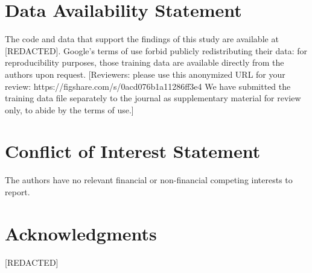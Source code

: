 \documentclass[12pt,letterpaper]{article} %
\begin{document}
\section*{Data Availability Statement}

The code and data that support the findings of this study are available at [REDACTED]. Google's terms of use forbid publicly redistributing their data: for reproducibility purposes, those training data are available directly from the authors upon request. [Reviewers: please use this anonymized URL for your review: https://figshare.com/s/0acd076b1a11286ff3e4 We have submitted the training data file separately to the journal as supplementary material for review only, to abide by the terms of use.]

\section*{Conflict of Interest Statement}

The authors have no relevant financial or non-financial competing interests to report.

\section*{Acknowledgments}

[REDACTED]


\setlength{\bibsep}{0.00cm plus 0.05cm} %


\end{document}
